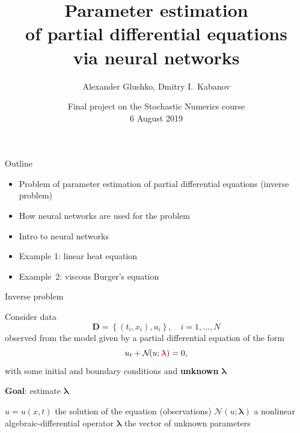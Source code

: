 \documentclass{beamer}
\title{Parameter estimation\\of partial differential equations\\via neural networks}
\author{Alexander Glushko, Dmitry I.\ Kabanov}
\institute{}
\date{Final project on the Stochastic Numerics course\\6 August 2019}
\def\\{}%
\renewcommand{\vec}[1]{\boldsymbol{#1}}
\newcommand{\VLambda}{\ensuremath{\vec{\lambda}}}
\newcommand{\NonlinOp}{\mathcal N\!}
\begin{document}
\maketitle

\begin{frame}{Outline}
\begin{itemize}
    \item Problem of parameter estimation of partial differential equations
          (inverse problem)
    \item How neural networks are used for the problem
    \item Intro to neural networks
    \item Example 1: linear heat equation
    \item Example~2: viscous Burger's equation
\end{itemize}
\end{frame}

\begin{frame}{Inverse problem}

Consider data
\[
    \vec{D} = \left\{(t_i, x_i), u_i\right\}, \quad i = 1, ..., N
\]
observed from the
model given by a partial differential equation of the form
\begin{equation*}
    \label{eq:pde}
    u_t + \mathcal N\!(u; {\color{red}\VLambda}) = 0,
\end{equation*}
with some initial and boundary conditions and \textbf{unknown} {\color{red}$\VLambda$}

{
\vspace{0.5cm}
\centering
\textbf{Goal}: estimate {\color{red}$\VLambda$}\par
}

\vspace{0.5cm}
$u=u(x, t)$ the solution of the equation (observations)\\
$\NonlinOp(u; \VLambda)$ a nonlinear algebraic-differential operator \\
$\VLambda$ the vector of unknown parameters

\end{frame}
\end{document}
